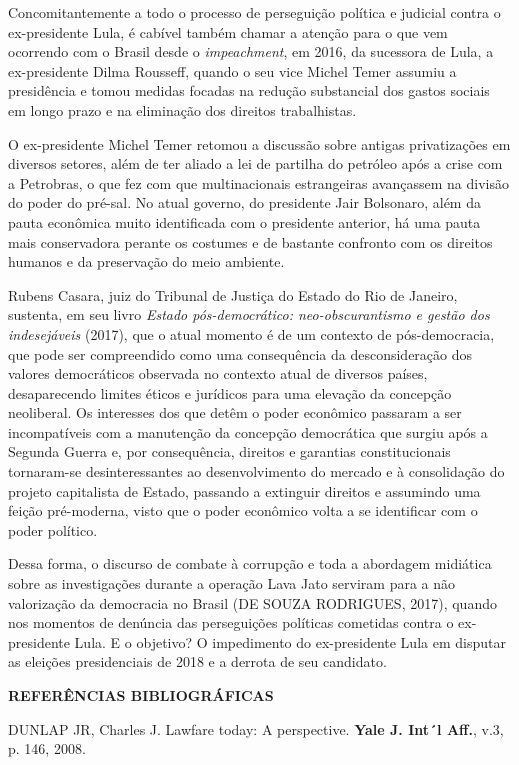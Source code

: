 Concomitantemente a todo o processo de perseguição política e judicial
contra o ex-presidente Lula, é cabível também chamar a atenção para o
que vem ocorrendo com o Brasil desde o \emph{impeachment}, em 2016, da
sucessora de Lula, a ex-presidente Dilma Rousseff, quando o seu vice
Michel Temer assumiu a presidência e tomou medidas focadas na redução
substancial dos gastos sociais em longo prazo e na eliminação dos
direitos trabalhistas.

O ex-presidente Michel Temer retomou a discussão sobre antigas
privatizações em diversos setores, além de ter aliado a lei de partilha
do petróleo após a crise com a Petrobras, o que fez com que
multinacionais estrangeiras avançassem na divisão do poder do pré-sal.
No atual governo, do presidente Jair Bolsonaro, além da pauta econômica
muito identificada com o presidente anterior, há uma pauta mais
conservadora perante os costumes e de bastante confronto com os direitos
humanos e da preservação do meio ambiente.

Rubens Casara, juiz do Tribunal de Justiça do Estado do Rio de Janeiro,
sustenta, em seu livro \emph{Estado pós-democrático: neo-obscurantismo e
gestão dos indesejáveis} (2017), que o atual momento é de um contexto de
pós-democracia, que pode ser compreendido como uma consequência da
desconsideração dos valores democráticos observada no contexto atual de
diversos países, desaparecendo limites éticos e jurídicos para uma
elevação da concepção neoliberal. Os interesses dos que detêm o poder
econômico passaram a ser incompatíveis com a manutenção da concepção
democrática que surgiu após a Segunda Guerra e, por consequência,
direitos e garantias constitucionais tornaram-se desinteressantes ao
desenvolvimento do mercado e à consolidação do projeto capitalista de
Estado, passando a extinguir direitos e assumindo uma feição
pré-moderna, visto que o poder econômico volta a se identificar com o
poder político.

Dessa forma, o discurso de combate à corrupção e toda a abordagem
midiática sobre as investigações durante a operação Lava Jato serviram
para a não valorização da democracia no Brasil (DE SOUZA RODRIGUES,
2017), quando nos momentos de denúncia das perseguições políticas
cometidas contra o ex-presidente Lula. E o objetivo? O impedimento do
ex-presidente Lula em disputar as eleições presidenciais de 2018 e a
derrota de seu candidato.

\textbf{REFERÊNCIAS BIBLIOGRÁFICAS}

DUNLAP JR, Charles J. Lawfare today: A perspective. \textbf{Yale J.
Int´l Aff.}, v.3, p. 146, 2008.

